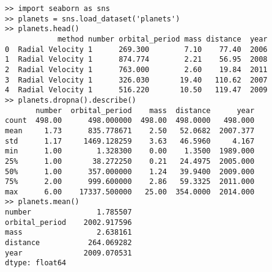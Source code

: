 \documentclass[10pt,compress]{beamer} %
\begin{document}
\begin{frame}
	\scriptsize{
	\begin{columns}
 	   \column{\textwidth}
		\begin{exampleblock}{}
		\vspace{-0.2cm} 
			\begin{lstlisting}
>> import seaborn as sns
>> planets = sns.load_dataset('planets')
>> planets.head()
            method number orbital_period mass distance  year
0  Radial Velocity 1      269.300        7.10    77.40  2006
1  Radial Velocity 1      874.774        2.21    56.95  2008
2  Radial Velocity 1      763.000        2.60    19.84  2011
3  Radial Velocity 1      326.030       19.40   110.62  2007
4  Radial Velocity 1      516.220       10.50   119.47  2009
>> planets.dropna().describe()
       number  orbital_period    mass  distance      year
count  498.00      498.000000  498.00  498.0000   498.000
mean     1.73      835.778671    2.50   52.0682  2007.377
std      1.17     1469.128259    3.63   46.5960     4.167
min      1.00        1.328300    0.00    1.3500  1989.000
25%      1.00       38.272250    0.21   24.4975  2005.000
50%      1.00      357.000000    1.24   39.9400  2009.000
75%      2.00      999.600000    2.86   59.3325  2011.000
max      6.00    17337.500000   25.00  354.0000  2014.000
>> planets.mean()
number               1.785507
orbital_period    2002.917596
mass                 2.638161
distance           264.069282
year              2009.070531
dtype: float64
\end{lstlisting}
			\vspace{-0.2cm} 
		\end{exampleblock}
	\end{columns}
	}
\end{frame}
\end{document}
